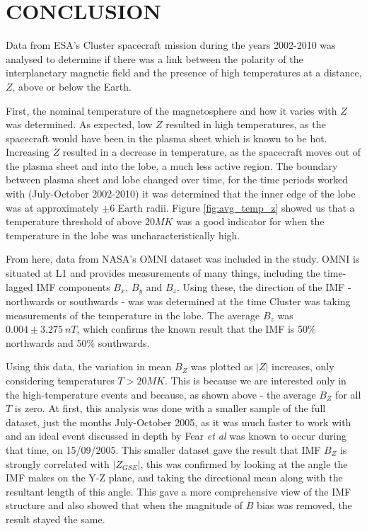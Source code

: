 \documentclass[12pt]{article}
\begin{document}
\section{CONCLUSION}
Data from ESA's Cluster spacecraft mission during the years 2002-2010 was analysed to determine if there was a link between the polarity of the interplanetary magnetic field and the presence of high temperatures at a distance, $Z$, above or below the Earth.

First, the nominal temperature of the magnetosphere and how it varies with $Z$ was determined. As expected, low $Z$ resulted in high temperatures, as the spacecraft would have been in the plasma sheet which is known to be hot. Increasing $Z$ resulted in a decrease in temperature, as the spacecraft moves out of the plasma sheet and into the lobe, a much less active region. The boundary between plasma sheet and lobe changed over time, for the time periods worked with (July-October 2002-2010) it was determined that the inner edge of the lobe was at approximately $\pm6$ Earth radii. Figure \ref{fig:avg_temp_z} showed us that a temperature threshold of above $20MK$ was a good indicator for when the temperature in the lobe was uncharacteristically high.

From here, data from NASA's OMNI dataset was included in the study. OMNI is situated at L1 and provides measurements of many things, including the time-lagged IMF components $B_x$, $B_y$ and $B_z$. Using these, the direction of the IMF - northwards or southwards -  was was determined at the time Cluster was taking measurements of the temperature in the lobe. The average $B_z$ was $0.004\pm3.275\ nT$, which confirms the known result that the IMF is 50\% northwards and 50\% southwards.

Using this data, the variation in mean $B_Z$ was plotted as $|Z|$ increases, only considering temperatures $T>20MK$. This is because we are interested only in the high-temperature events and because, as shown above - the average $B_Z$ for all $T$ is zero. At first, this analysis was done with a smaller sample of the full dataset, just the months July-October 2005, as it was much faster to work with and an ideal event discussed in depth by Fear \textit{et al} \cite{Fear1506} was known to occur during that time, on 15/09/2005. This smaller dataset gave the result that IMF $B_Z$ is strongly correlated with $|Z_{GSE}|$, this was confirmed by looking at the angle the IMF makes on the Y-Z plane, and taking the directional mean along with the resultant length of this angle. This gave a more comprehensive view of the IMF structure and also showed that when the magnitude of $B$ bias was removed, the result stayed the same.
\end{document}
